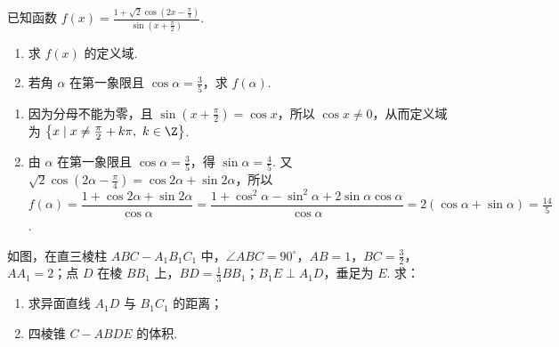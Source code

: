 \begin{problem}
已知函数 \( f(x) = \frac{1 + \sqrt{2}\cos\left(2x - \frac{\pi}{4}\right)}{\sin\left(x + \frac{\pi}{2}\right)} \).

\begin{enumerate}
\item 求 \( f(x) \) 的定义域.
\item 若角 \(\alpha\) 在第一象限且 \(\cos \alpha = \frac{3}{5}\)，求 \(f(\alpha)\).
\end{enumerate}
\end{problem}

\begin{solution}
\begin{enumerate}
\item 因为分母不能为零，且 \(\sin\left(x+\frac\pi2\right)=\cos x\)，所以 \(\cos x\ne0\)，从而定义域为 \(\left\{x\mid x\ne\frac\pi2+k\pi,\ k\in\Z\right\}\).
\item 由 \(\alpha\) 在第一象限且 \(\cos\alpha=\frac35\)，得 \(\sin\alpha=\frac45\). 又 \(\sqrt2\cos\left(2\alpha-\frac\pi4\right)=\cos2\alpha+\sin2\alpha\)，所以 \(f(\alpha)=\dfrac{1+\cos2\alpha+\sin2\alpha}{\cos\alpha}=\dfrac{1+\cos^2\alpha-\sin^2\alpha+2\sin\alpha\cos\alpha}{\cos\alpha}=2(\cos\alpha+\sin\alpha)=\frac{14}{5}\).
\end{enumerate}
\end{solution}

\begin{problem}
如图，在直三棱柱 \(ABC - A_{1}B_{1}C_{1}\) 中，\(\angle ABC = 90^{\circ}\)，\(AB = 1\)，\(BC = \frac{3}{2}\)，\(AA_{1} = 2\)；点 \(D\) 在棱 \(BB_{1}\) 上，\(BD = \frac{1}{3} BB_{1}\)；\(B_{1}E \perp A_{1}D\)，垂足为 \(E\). 求：

\begin{enumerate}
\item 求异面直线 \(A_{1}D\) 与 \(B_{1}C_{1}\) 的距离；
\item 四棱锥 \(C - ABDE\) 的体积.
\end{enumerate}

\end{problem}

